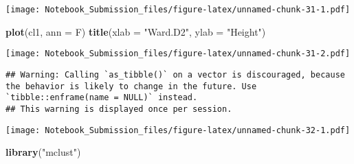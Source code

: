 \documentclass[
]{article}
\newenvironment{Shaded}{\begin{snugshade}}{\end{snugshade}}
\newcommand{\DataTypeTok}[1]{\textcolor[rgb]{0.13,0.29,0.53}{#1}}
\newcommand{\DecValTok}[1]{\textcolor[rgb]{0.00,0.00,0.81}{#1}}
\newcommand{\KeywordTok}[1]{\textcolor[rgb]{0.13,0.29,0.53}{\textbf{#1}}}
\newcommand{\NormalTok}[1]{#1}
\newcommand{\OperatorTok}[1]{\textcolor[rgb]{0.81,0.36,0.00}{\textbf{#1}}}
\newcommand{\StringTok}[1]{\textcolor[rgb]{0.31,0.60,0.02}{#1}}
\begin{document}
\texttt{[image: Notebook\_Submission\_files/figure-latex/unnamed-chunk-31-1.pdf]}

\begin{Shaded}
\begin{Highlighting}[]
\KeywordTok{plot}\NormalTok{(cl1, }\DataTypeTok{ann =}\NormalTok{ F)}
\KeywordTok{title}\NormalTok{(}\DataTypeTok{xlab =} \StringTok{"Ward.D2"}\NormalTok{, }\DataTypeTok{ylab =} \StringTok{"Height"}\NormalTok{)}
\end{Highlighting}
\end{Shaded}

\texttt{[image: Notebook\_Submission\_files/figure-latex/unnamed-chunk-31-2.pdf]}

\begin{Shaded}
\end{Shaded}

\begin{verbatim}
## Warning: Calling `as_tibble()` on a vector is discouraged, because the behavior is likely to change in the future. Use `tibble::enframe(name = NULL)` instead.
## This warning is displayed once per session.
\end{verbatim}

\texttt{[image: Notebook\_Submission\_files/figure-latex/unnamed-chunk-32-1.pdf]}

\begin{Shaded}
\begin{Highlighting}[]
\KeywordTok{library}\NormalTok{(}\StringTok{"mclust"}\NormalTok{)}
\end{Highlighting}
\end{Shaded}
\end{document}
